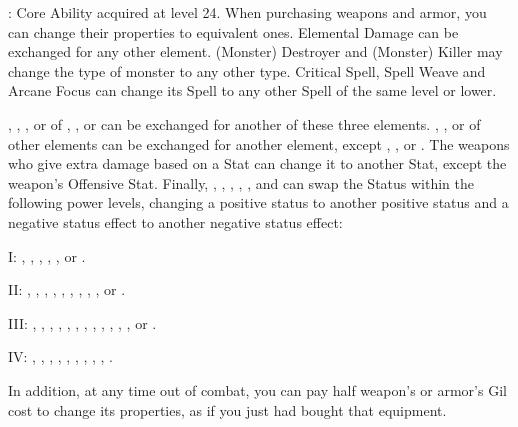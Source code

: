 \begin{ffminipage}
\noindent{}: Core Ability acquired at level 24. When purchasing weapons and armor, you can change their properties to equivalent ones. Elemental Damage can be exchanged for any other element. (Monster) Destroyer and (Monster) Killer may change the type of monster to any other type. Critical Spell, Spell Weave and Arcane Focus can change its Spell to any other Spell of the same level or lower. \pc

, , , or  of , , or  can be exchanged for another of these three elements. , ,  or  of other elements can be exchanged for another element, except , , or . The weapons who give extra damage based on a Stat can change it to another Stat, except the weapon’s Offensive Stat. Finally, , , , , , and  can swap the Status within the following power levels, changing a positive status to another positive status and a negative status effect to another negative status effect:

I: , , , , , or .

II: , , , , , , , , , or .

III: , , , , , , , , , , , , or .

IV: , , , , , , , , , . \pc

In addition, at any time out of combat, you can pay half weapon’s or armor’s Gil cost to change its properties, as if you just had bought that equipment. \pc


\end{ffminipage}
